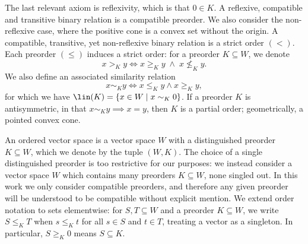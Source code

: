 \documentclass{article}
\theoremstyle{plain}
\theoremstyle{definition}
\theoremstyle{remark}
\begin{document}
The last relevant axiom is reflexivity, which is that $0 \in K$. A reflexive,
compatible and transitive binary relation is a compatible preorder.
We also consider the non-reflexive case, where the positive cone
is a convex set without the origin. A compatible, transitive, yet non-reflexive 
binary relation is a strict order $(<)$. Each preorder $(\le)$ induces a strict
order: for a preorder $K \subseteq W$, we denote 
\begin{equation*}
x >_K y \iff x \ge_K y \; \land \; x \not \le_K y.
\end{equation*}
We also define an associated similarity relation 
\begin{equation*}
x \sim_K y \iff x \le_K y \land  x \ge_K y,
\end{equation*}
for which we have $\lin(K) = \{x \in W \mid x \sim_K 0\}$.
If a preorder $K$ is antisymmetric, in that $x \sim_K y \implies x = y$,
then $K$ is a partial order; geometrically, a pointed convex cone.

An ordered vector space is a vector space $W$ with a
distinguished preorder $K \subseteq W$, which we denote by the tuple $(W, K)$.
The choice of a single distinguished preorder is too restrictive
for our purposes: we instead consider a vector space $W$ which
contains many preorders $K \subseteq W$, none singled out.
In this work we only consider compatible preorders, and therefore any
given preorder will be understood to be compatible without explicit mention.
We extend order notation to sets elementwise: for $S, T \subseteq W$ and a
preorder $K \subseteq W$, we write $S \le_{K} T$ when
$s \le_{K} t$ for all $s \in S$ and $t \in T$, treating a vector as a
singleton. In particular, $S \ge_{K} 0$ means $S \subseteq K$.
\end{document}
